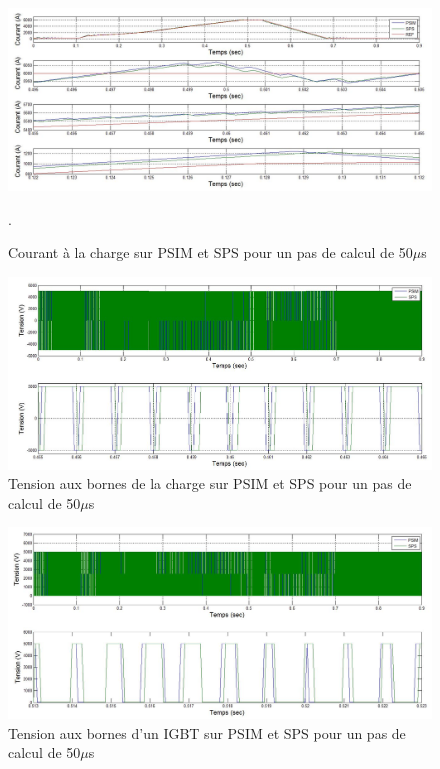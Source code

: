 \documentclass[11pt,letterpaper,final]{report}
\begin{document}
\begin{figure}[htb]
\centering
\includegraphics[scale=0.5]{Fig/Hacheur4Quadrants/HacheurCourantCharge50u.jpg}
\caption{Courant à la charge sur PSIM et SPS pour un pas de calcul de 50$\mu$s}.
\label{comp_PSIM_SPS}
\end{figure}


\begin{figure}[htb]
\centering
\includegraphics[scale=0.5]{Fig/Hacheur4Quadrants/HacheurTensionCharge50u.jpg}
\caption{Tension aux bornes de la charge sur PSIM et SPS pour un pas de calcul de 50$\mu$s}
\label{err_cou}
\end{figure}


\begin{figure}[htb]
\centering
\includegraphics[scale=0.5]{Fig/Hacheur4Quadrants/HacheurTensionIGBT50u.jpg}
\caption{Tension aux bornes d'un IGBT sur PSIM et SPS pour un pas de calcul de 50$\mu$s}
\label{hc_IG_ten_50}
\end{figure}
\end{document}
